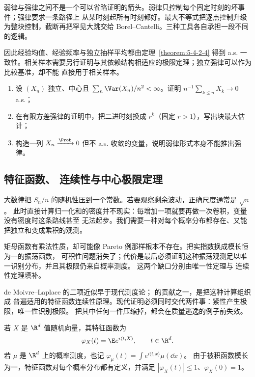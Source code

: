 弱律与强律之间不是一个可以省略证明的箭头。弱律只控制每个固定时刻的坏事件；强律要求一条路径上
从某时刻起所有时刻都好。最大不等式把逐点控制升级为整块控制，截断再把罕见大跳交给
Borel--Cantelli。三种工具各自承担一段不同的逻辑。

因此经验均值、经验频率与独立抽样平均都由定理~\ref{theorem:5-4-2-4} 得到 a.s.
一致性。相关样本需要另行证明与其依赖结构相适应的极限定理；独立强律可以作为比较基准，却不能
直接用于相关样本。

\begin{exercise}[强律证明的关键步骤]
\begin{enumerate}
 \item 设 $(X_n)$ 独立、中心且 $\sum_n\Var(X_n)/n^2<\infty$。证明
 $n^{-1}\sum_{k\leq n}X_k\to0$ a.s.；
 \item 在有限方差强律的证明中，把二进时刻换成 $r^k$（固定 $r>1$），写出块最大估计；
 \item 构造一列 $X_n\xrightarrow{\Prob}0$ 但不 a.s. 收敛的变量，说明弱律形式本身不能推出强律。
\end{enumerate}
\end{exercise}

\subsection{特征函数、\Levy{} 连续性与中心极限定理}\label{subsec:5-4-3}

大数律把 $S_n/n$ 的随机性压到一个常数。若要观察剩余波动，正确尺度通常是 $\sqrt n$。
此时直接计算归一化和的密度并不现实：每增加一项就要再做一次卷积，变量没有密度时这条路线甚至
无法起步。我们需要一种对每个概率分布都存在、又能把独立和变成乘积的观测。

矩母函数有乘法性质，却可能像 Pareto 例那样根本不存在。把实指数换成模长恒为一的振荡函数，
可积性问题消失了；代价是最后必须证明这种振荡观测足以唯一识别分布，并且其极限仍来自概率测度。
这两个缺口分别由唯一性定理与 \Levy{} 连续性定理填补。

de Moivre--Laplace 的二项近似早于现代测度论；\Levy{} 的贡献之一，是把这种计算组织成
普遍适用的特征函数连续性原理。现代证明必须同时交代两件事：紧性产生极限，唯一性识别极限。
把其中任何一件压缩掉，都会在质量逃逸的例子前失效。

\begin{definition}[特征函数]\label{def:5-4-3-1}
若 $X$ 是 $\R^d$ 值随机向量，其特征函数为
\[
 \varphi_X(t)=\E e^{i\langle t,X\rangle},\qquad t\in\R^d.
\]
若 $\mu$ 是 $\R^d$ 上的概率测度，也记
$\varphi_\mu(t)=\int e^{i\langle t,x\rangle}\mu(\dd x)$。
由于被积函数模长为一，特征函数对每个概率分布都有定义，并满足
$|\varphi_X(t)|\leq1$、$\varphi_X(0)=1$。
\end{definition}

